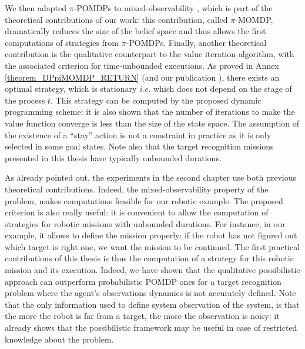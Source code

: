 We then adapted $\pi$-POMDPs 
to mixed-observability \cite{OngShaoHsuWee-IJRR10},
which is part of the theoretical contributions of our work:
this contribution, called $\pi$-MOMDP, 
dramatically reduces the size of the belief space 
and thus allows the first computations of strategies from $\pi$-POMDPs. 
Finally, another theoretical contribution 
is the qualitative counterpart 
to the value iteration algorithm,
with the associated criterion 
for time-unbounded executions. 
As proved in Annex \ref{theorem_DPpiMOMDP_RETURN}
(and our publication \cite{Drougard13}), 
there exists an optimal strategy, 
which is stationary 
\textit{i.e.} which does not depend on the stage of the process $t$. 
This strategy can be computed 
by the proposed dynamic programming scheme: 
it is also shown that 
the number of iterations 
to make the value function converge 
is less than the size of the state space.
The assumption of the existence of a ``stay'' action
is not a constraint in practice
as it is only selected 
in some goal states.
Note also that the target recognition missions 
presented in this thesis 
have typically unbounded durations.

As already pointed out,
the experiments in the second chapter 
use both previous theoretical contributions.
Indeed, the mixed-observability property of the problem,
makes computations feasible for our robotic example.
The proposed criterion is also really useful: 
it is convenient to allow 
the computation of strategies 
for robotic missions 
with unbounded durations.
For instance, in our example, 
it allows to define the mission properly: 
if the robot has not figured out 
which target is right one,
we want the mission to be continued.
The first practical contributions of this thesis 
is thus the computation of a strategy
for this robotic mission and its execution.
Indeed, we have shown 
that the qualitative possibilistic approach 
can outperform probabilistic POMDP ones 
for a target recognition problem 
where the agent's observations dynamics 
is not accurately defined.
Note that the only information used 
to define system observation of the system,
is that the more the robot is far from a target, 
the more the observation is noisy:
it already shows that the possibilistic framework
may be useful in case of restricted knowledge 
about the problem.


